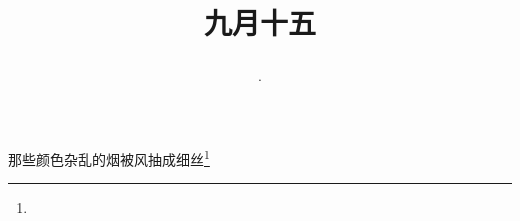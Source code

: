 \title{\date[d=17,m=10,y=2024][year:cn-y,年,month:cn,day:cn,日,·,weekday]·九月十五 }
那些颜色杂乱的烟被风抽成细丝\footnote{ }

